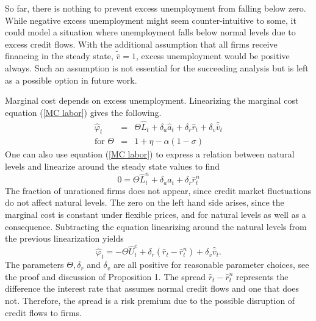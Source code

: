 \documentclass{article}
\begin{document}
So far, there is nothing to prevent excess unemployment from falling below
zero. While negative excess unemployment might seem counter-intuitive to
some, it could model a situation where unemployment falls below normal
levels due to excess credit flows. With the additional assumption that all
firms receive financing in the steady state, $\widetilde{\overline{v}}=1$,
excess unemployment would be positive always. Such an assumption is not
essential for the succeeding analysis but is left as a possible option in
future work.

Marginal cost depends on excess unemployment. Linearizing the marginal
cost equation (\ref{MC labor}) gives the following.
\begin{eqnarray*}
\widehat{\varphi }_{t} &=&\Theta \widehat{L}_{t}+\delta _{a}\widehat{a}%
_{t}+\delta _{r}\widehat{r}_{t}+\delta _{v}\widehat{\overline{v}}_{t} \\
\text{for }\Theta &=&1+\eta -\alpha \left( 1-\sigma \right)
\end{eqnarray*}
One can also use equation (\ref{MC labor}) to express a relation between
natural levels and linearize around the steady state values to find
\begin{equation*}
0=\Theta \widehat{L}_{t}^{n}+\delta _{a}\widehat{a}_{t}+\delta _{r}\widehat{r%
}_{t}^{n}
\end{equation*}
The fraction of unrationed firms does not appear, since credit market
fluctuations do not affect natural levels. The zero on the left hand side
arises, since the marginal cost is constant under flexible prices, and for
natural levels as well as a consequence. Subtracting the equation
linearizing around the natural levels from the previous linearization yields
\begin{equation}
\widehat{\varphi }_{t}=-\Theta \widehat{U}_{t}^{c}+\delta _{r}\left(
\widehat{r}_{t}-\widehat{r}_{t}^{n}\right) +\delta _{v}\widehat{\overline{v}}%
_{t}.  \label{MC U}
\end{equation}
The parameters $\Theta ,\delta _{r}$ and $\delta _{v}$ are all positive for
reasonable parameter choices, see the proof and discussion of Proposition 1.
The spread $\widehat{r}_{t}-\widehat{r}_{t}^{n}$ represents the difference
the interest rate that assumes normal credit flows and one that does not.
Therefore, the spread is a risk premium due to the possible disruption of
credit flows to firms.
\end{document}
